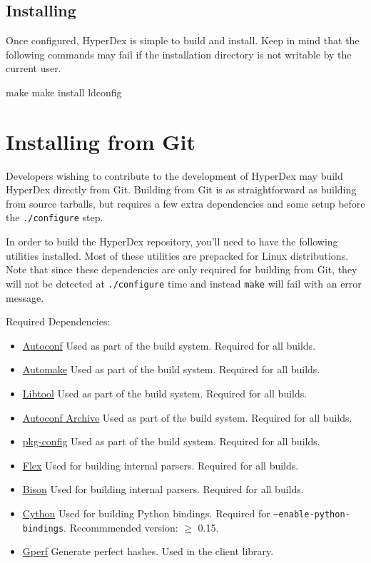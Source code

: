 \subsection{Installing}

Once configured, HyperDex is simple to build and install.  Keep in mind that the
following commands may fail if the installation directory is not writable by the
current user.

\begin{consolecode}
make
make install
ldconfig
\end{consolecode}

\section{Installing from Git}

Developers wishing to contribute to the development of HyperDex may build
HyperDex directly from Git.  Building from Git is as straightforward as building
from source tarballs, but requires a few extra dependencies and some setup
before the \texttt{./configure} step.

In order to build the HyperDex repository, you'll need to have the following
utilities installed.  Most of these utilities are prepacked for Linux
distributions.  Note that since these dependencies are only required for
building from Git, they will not be detected at \texttt{./configure} time and
instead \texttt{make} will fail with an error message.

Required Dependencies:

\begin{itemize}
\item \href{http://www.gnu.org/software/autoconf/}{Autoconf} Used as part of
    the build system.  Required for all builds.
\item \href{http://www.gnu.org/software/automake/}{Automake} Used as part of
    the build system.  Required for all builds.
\item \href{http://www.gnu.org/software/libtool/}{Libtool} Used as part of the
    build system.  Required for all builds.
\item \href{http://www.gnu.org/software/autoconf-archive/}{Autoconf Archive}
    Used as part of the build system.  Required for all builds.
\item \href{http://www.freedesktop.org/wiki/Software/pkg-config/}{pkg-config}
    Used as part of the build system.  Required for all builds.
\item \href{http://flex.sourceforge.net/}{Flex} Used for building internal
    parsers.  Required for all builds.
\item \href{http://www.gnu.org/software/bison/}{Bison} Used for building
    internal parsers.  Required for all builds.
\item \href{http://cython.org/}{Cython} Used for building Python bindings.
    Required for \texttt{--enable-python-bindings}.
    Recommmended version: $\ge$ 0.15.
\item \href{http://www.gnu.org/software/gperf/}{Gperf}  Generate perfect
    hashes.  Used in the client library.
\end{itemize}

